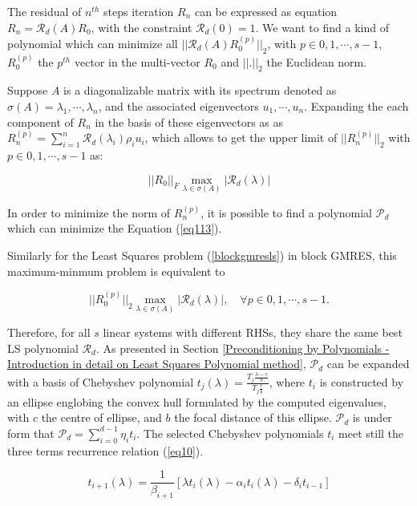 The residual of \(n^{th}\) steps iteration \(R_n\) can be expressed as equation $R_n=\mathcal{R}_d(A)R_0$, with the constraint \(\mathcal{R}_d(0)=1\). We want to find a kind of polynomial which can minimize all \(||\mathcal{R}_d(A)R_0^{(p)}||_2\), with $p \in 0,1,\cdots,s-1$, $R_0^{(p)}$ the $p^{th}$ vector in the multi-vector $R_0$ and \(||.||_2\) the Euclidean norm.

Suppose $A$ is a diagonalizable matrix with its spectrum denoted as \(\sigma(A)=\lambda_1, \cdots, \lambda_n\), and the associated eigenvectors \(u_1, \cdots, u_n\). Expanding the each component of \(R_n\) in the basis of these eigenvectors as as $R_n^{(p)}=\sum_{i=1}^{n}\mathcal{R}_d(\lambda_i)\rho_i u_i$, which allows to get the upper limit of $||R_n^{(p)}||_2$ with $p \in 0,1,\cdots,s-1$ as:

\begin{equation}
\label{eq113}
||R_0||_F \max_{\lambda \in \sigma(A)}|\mathcal{R}_d(\lambda)|
\end{equation}

In order to minimize the norm of $R_n^{(p)}$, it is possible to find a polynomial $\mathcal{P}_d$ which can minimize the Equation (\ref{eq113}).

Similarly for the Least Squares problem (\ref{blockgmresls}) in block GMRES, this maximum-minmum problem is equivalent to 

\begin{equation}
	||R_0^{(p)}||_2 \max_{\lambda \in \sigma(A)}|\mathcal{R}_d(\lambda)|, \quad \forall p \in 0,1,\cdots,s-1.
\end{equation}

Therefore, for all $s$ linear systems with different RHSs, they share the same best LS polynomial $\mathcal{R}_d$. As presented in Section \ref{Preconditioning by Polynomials - Introduction in detail on Least Squares Polynomial method}, $\mathcal{P}_d$ can be expanded with a basis of Chebyshev polynomial $t_j(\lambda)=\frac{T_j \frac{\lambda-c}{b}}{T_j \frac{c}{b}}$, where $t_i$ is constructed by an ellipse englobing the convex hull formulated by the computed eigenvalues, with $c$ the centre of ellipse, and $b$ the focal distance of this ellipse. $\mathcal{P}_d$ is under form that $\mathcal{P}_d=\sum_{i=0}^{d-1}\eta_it_i$. The selected Chebyshev polynomials \(t_i\) meet still the three terms recurrence relation (\ref{eq10}). 

\begin{equation}
\label{eq10}
t_{i+1}(\lambda)=\frac{1}{\beta_{i+1}}[\lambda t_i(\lambda)-\alpha_i t_i(\lambda)-\delta_i t_{i-1}]
\end{equation}


